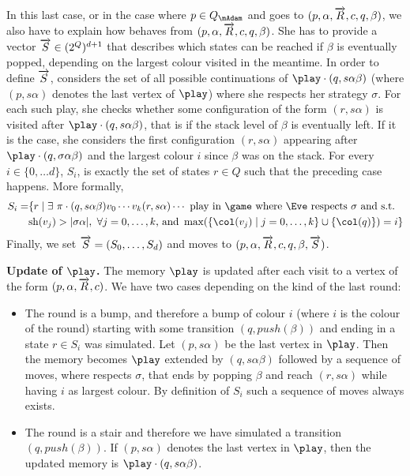 In this last case, or in the case where $p\in Q_\mAdam$ and \Adam goes
to $(p,\alpha,\overrightarrow{R},c,q,\beta)$, we also have to explain
how \Eve behaves from
$(p,\alpha,\overrightarrow{R},c,q,\beta)$. She has to provide a
vector $\overrightarrow{S}\in (2^Q)^{d+1}$ that describes which states
can be reached if $\beta$ is eventually popped, depending on the largest colour visited in the
meantime. In order to define $\overrightarrow{S}$, \Eve considers the set of
all possible continuations of $\play\cdot(q,s\alpha\beta)$ (where
$(p,s\alpha)$ denotes the last vertex of $\play$) where she
respects her strategy $\sigma$. For each such play, she checks whether some
configuration of the form $(r,s\alpha)$ is visited after $\play\cdot
(q,s\alpha\beta)$, that is if the stack level of $\beta$ is eventually left. If it
is the case, she considers the first configuration $(r,s\alpha)$
appearing after $\play\cdot (q,\sigma\alpha\beta)$ and the largest
colour $i$ since
$\beta$ was on the stack.
For every $i\in\{0,\dots d\}$, $S_i$, is exactly the set of states
$r\in Q$ such that the preceding case happens. 
More formally, 
\begin{equation*}
\begin{split}
S_i=&\{r\mid \exists\ \pi\cdot(q,s\alpha\beta)v_0\cdots v_k(r,s\alpha)\cdots\text{ play in } \game  \text{ where \Eve respects } \sigma \text{ and s.t. }\\ & \sh(v_j)>|\sigma\alpha|,\ \forall j=0,\dots,k  \text{, and }\max(\{\pdscol{v_j}\mid j=0,\dots,k\}\cup\{\pdscol{q}\})=i\}
\end{split}
\end{equation*}
Finally, we set $\overrightarrow{S}=(S_0,\dots,S_d)$ and \Eve moves to
$(p,\alpha,\overrightarrow{R},c,q,\beta,\overrightarrow{S})$.

\vspace{0.1cm}
\textbf{Update of $\play$. } The memory $\play$ is updated after
each visit to a vertex of the form $(p,\alpha,\overrightarrow{R},c)$.
We have two cases depending on the kind of the last round:

\begin{itemize}
\item The round is a bump, and therefore a bump
  of colour $i$ (where $i$ is the colour of the round) starting with some
  transition $(q,push(\beta))$ and ending in a state $r\in S_i$ was simulated. Let $(p,s\alpha)$ be the last vertex in
  $\play$. Then the memory becomes $\play$ extended by
  $(q,s\alpha\beta)$ followed by a sequence of moves, where \Eve
  respects $\sigma$, that ends by popping $\beta$ and reach
  $(r,s\alpha)$ while having $i$ as largest colour. By definition of $S_i$ such a sequence of moves always exists.

\item The round is a stair and therefore we have simulated a transition 
  $(q,push(\beta))$. If $(p,s\alpha)$ denotes the last vertex in $\play$, then the updated memory is $\play\cdot (q,s\alpha\beta)$.
\end{itemize}

